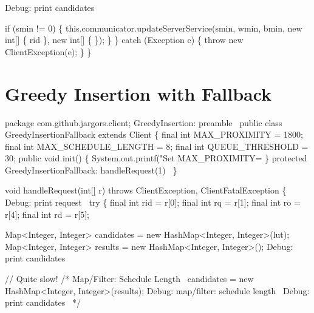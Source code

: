     \LA{}Debug: print candidates~{\nwtagstyle{}}\RA{}

    if (smin != 0) \{
      this.communicator.updateServerService(smin, wmin, bmin,
          new int[] \{ rid \}, new int[] \{ \});
    \}
  \} catch (Exception e) \{
    throw new ClientException(e);
  \}
\}
\nwendcode{}\nwdocspar

\section{Greedy Insertion with Fallback}

\nwenddocs{}\endmoddef\nwstartdeflinemarkup\nwenddeflinemarkup
package com.github.jargors.client;
\LA{}GreedyInsertion: preamble~{\nwtagstyle{}}\RA{}
public class GreedyInsertionFallback extends Client \{
  final int MAX_PROXIMITY = 1800;
  final int MAX_SCHEDULE_LENGTH = 8;
  final int QUEUE_THRESHOLD = 30;
  public void init() \{
    System.out.printf("Set MAX_PROXIMITY=%
  \}
  protected \LA{}GreedyInsertionFallback: handleRequest(1)~{\nwtagstyle{}}\RA{}
\}
\nwendcode{}\nwdocspar

\nwenddocs{}\endmoddef\nwstartdeflinemarkup{}\nwenddeflinemarkup
void handleRequest(int[] r) throws ClientException, ClientFatalException \{
  \LA{}Debug: print request~{\nwtagstyle{}}\RA{}
  try \{
    final int rid = r[0];
    final int rq  = r[1];
    final int ro  = r[4];
    final int rd  = r[5];

    Map<Integer, Integer> candidates = new HashMap<Integer, Integer>(lut);
    Map<Integer, Integer> results = new HashMap<Integer, Integer>();
    \LA{}Debug: print candidates~{\nwtagstyle{}}\RA{}

    // Quite slow!
    /*
    \LA{}Map/Filter: Schedule Length~{\nwtagstyle{}}\RA{}
    candidates = new HashMap<Integer, Integer>(results);
    \LA{}Debug: map/filter: schedule length~{\nwtagstyle{}}\RA{}
    \LA{}Debug: print candidates~{\nwtagstyle{}}\RA{}
    */

